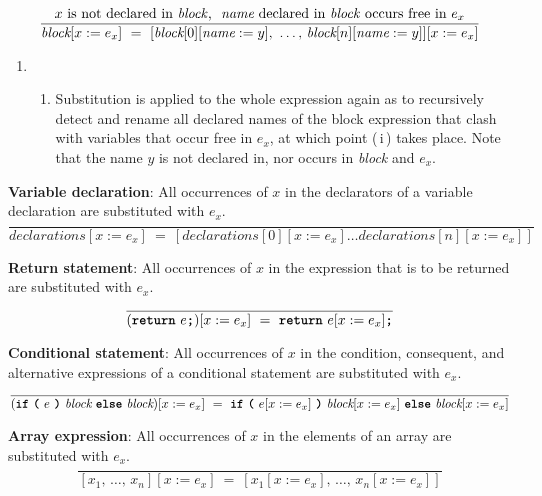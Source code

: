         \[
        \frac{
          x \text{ is not declared in \textit{block}}\text{, } \ \textit{name} \text{ declared in \textit{block} occurs free in } e_x
        }{
          \textit{block}[x := e_x]
          \ = \ 
          [\textit{block}[0][\textit{name} := y] \text{, } \ldots \text{, } \textit{block}[n][\textit{name} := y]][x := e_x]
        }
        \]
\begin{enumerate}
    \item[]
    \begin{enumerate}[label=\roman*., start=2]
        \item[]
        \vspace{3mm}
        Substitution is applied to the whole expression again as to recursively detect and rename all declared names of the block expression that clash with variables that occur free in $e_x$, at which point (\,i\,) takes place. Note that the name $y$ is not declared in, nor occurs in \textit{block} and $e_x$.
    \end{enumerate}
\end{enumerate}

\vspace{10mm}
\textbf{Variable declaration}: All occurrences of $x$ in the declarators of a variable declaration are substituted with $e_x$.
\[
\frac{
}{
  \textit{declarations}[x := e_x]
  \ = \ 
  [\textit{declarations}[0][x := e_x] \ldots \textit{declarations}[n][x := e_x]]
}
\]

\vspace{10mm}
\textbf{Return statement}: All occurrences of $x$ in the expression that is to be returned are substituted with $e_x$.
\[
\frac{
}{
  (\textbf{\texttt{return}} \ e\textbf{\texttt{;}})[x := e_x]
  \ = \ 
  \textbf{\texttt{return}} \ e[x := e_x]\textbf{\texttt{;}}
}
\]

\vspace{10mm}
\textbf{Conditional statement}: All occurrences of $x$ in the condition, consequent, and alternative expressions of a conditional statement are substituted with $e_x$.
\[
\frac{
}{
  (
  \textbf{\texttt{if}}\ 
  \textbf{\texttt{(}}\ 
  e \ 
  \textbf{\texttt{)}} \ 
  \textit{block} \
  \textbf{\texttt{else}} \ 
  \textit{block}
  )[x := e_x]
  \ = \ 
  \textbf{\texttt{if}}\ 
  \textbf{\texttt{(}}\ 
  e[x := e_x] \ 
  \textbf{\texttt{)}} \ 
  \textit{block}[x := e_x] \
  \textbf{\texttt{else}} \ 
  \textit{block}[x := e_x]
}
\]

\vspace{10mm}
\textbf{Array expression}: All occurrences of $x$ in the elements of an array are substituted with $e_x$.
\[
\frac{
}{
  [x_1 \text{, } \ldots \text{, } x_n][x := e_x]
  \ = \ 
  [x_1[x := e_x] \text{, } \ldots \text{, } x_n[x := e_x]]
}
\]


